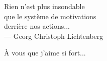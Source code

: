 \cleardoublepage
\thispagestyle{empty}


\vspace*{3cm}

\begin{raggedleft}
	Rien n'est plus insondable\\
	que le système de motivations\\
	derrière nos actions... \\
	--- Georg Christoph Lichtenberg\\
\end{raggedleft}

\vspace{4cm}

\begin{center}
    À  vous que j'aime si fort...\\
    
\end{center}


